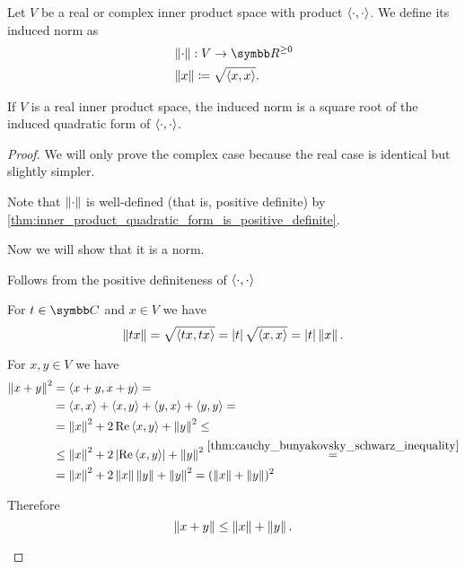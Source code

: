 \begin{definition}\label{def:bilinear_form_induced_norm}
  Let \( V \) be a real or complex inner product space with product \( \left\langle \cdot, \cdot \right\rangle \). We define its induced norm as
  \begin{align*}
    &\Norm \cdot : V \to \R^{\geq 0} \\
    &\Norm x \coloneqq \sqrt{\Prod x x}.
  \end{align*}

  If \( V \) is a real inner product space, the induced norm is a square root of the induced quadratic form of \( \left\langle \cdot, \cdot \right\rangle \).
\end{definition}
\begin{proof}
  We will only prove the complex case because the real case is identical but slightly simpler.

  Note that \( \left\Vert \cdot \right\Vert \) is well-defined (that is, positive definite) by \cref{thm:inner_product_quadratic_form_is_positive_definite}.

  Now we will show that it is a norm.
  \begin{description}
     Follows from the positive definiteness of \( \left\langle \cdot, \cdot \right\rangle \)

     For \( t \in \C \) and \( x \in V \) we have
    \begin{equation*}
      \left\Vert tx \right\Vert = \sqrt{\left\langle tx, tx \right\rangle} = \left\vert t \right\vert \sqrt{\left\langle x, x \right\rangle} = \left\vert t \right\vert \left\Vert x \right\Vert.
    \end{equation*}

     For \( x, y \in V \) we have
    \begin{align*}
      \left\Vert x + y \right\Vert^2
      &=
      \left\langle x + y, x + y \right\rangle
      = \\ &=
      \left\langle x, x \right\rangle + \left\langle x, y \right\rangle + \left\langle y, x \right\rangle + \left\langle y, y \right\rangle
      = \\ &=
      \left\Vert x \right\Vert^2 + 2 \operatorname{Re} \left\langle x, y \right\rangle + \left\Vert y \right\Vert^2
      \leq \\ &\leq
      \left\Vert x \right\Vert^2 + 2 \left\vert \operatorname{Re} \left\langle x, y \right\rangle \right\vert + \left\Vert y \right\Vert^2
      \overset {\ref{thm:cauchy_bunyakovsky_schwarz_inequality}} = \\ &=
      \left\Vert x \right\Vert^2 + 2 \left\Vert x \right\Vert \left\Vert y \right\Vert + \left\Vert y \right\Vert^2
      =
      (\left\Vert x \right\Vert + \left\Vert y \right\Vert)^2
    \end{align*}

    Therefore
    \begin{equation*}
      \left\Vert x + y \right\Vert \leq \left\Vert x \right\Vert + \left\Vert y \right\Vert.
    \end{equation*}
  \end{description}
\end{proof}
